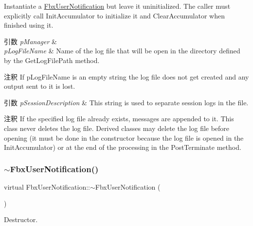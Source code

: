 Instantiate a \hyperlink{class_fbx_user_notification}{Fbx\+User\+Notification} but leave it uninitialized. The caller must explicitly call Init\+Accumulator to initialize it and Clear\+Accumulator when finished using it. 
\begin{DoxyParams}{引数}
{\em p\+Manager} & \\
\hline
{\em p\+Log\+File\+Name} & Name of the log file that will be open in the directory defined by the Get\+Log\+File\+Path method. \\
\hline
\end{DoxyParams}
\begin{DoxyRemark}{注釈}
If p\+Log\+File\+Name is an empty string the log file does not get created and any output sent to it is lost. 
\end{DoxyRemark}

\begin{DoxyParams}{引数}
{\em p\+Session\+Description} & This string is used to separate session logs in the file. \\
\hline
\end{DoxyParams}
\begin{DoxyRemark}{注釈}
If the specified log file already exists, messages are appended to it. This class never deletes the log file. Derived classes may delete the log file before opening (it must be done in the constructor because the log file is opened in the Init\+Accumulator) or at the end of the processing in the Post\+Terminate method. 
\end{DoxyRemark}
\mbox{\label{class_fbx_user_notification_a74a886b6fd62277275a953841f19400b}} 
\subsubsection{\texorpdfstring{$\sim$\+Fbx\+User\+Notification()}{~FbxUserNotification()}}
{\footnotesize\ttfamily virtual Fbx\+User\+Notification\+::$\sim$\+Fbx\+User\+Notification (\begin{DoxyParamCaption}{ }\end{DoxyParamCaption})\hspace{0.3cm}{\ttfamily [virtual]}}



Destructor. 



